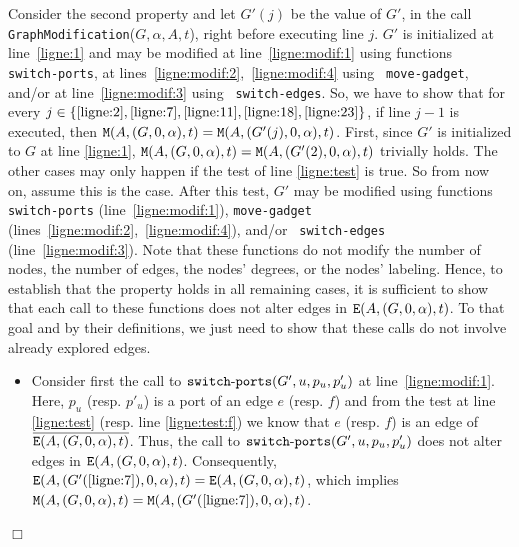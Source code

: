 \documentclass[11pt]{article}
\newcommand{\qed}{\hfill $\Box$ \bigbreak}
\newenvironment{proof}{\noindent {\bf Proof.}}{\qed}
\begin{document}
{\begin{proof}
  Consider the second property and let $G'(j)$ be the value of $G'$, in the call {\tt
    GraphModification}($G,\alpha,A,t$),
  right before executing line $j$.
$G'$ is initialized at line~\ref{ligne:1} and may be modified
  at line~\ref{ligne:modif:1} using functions {\tt
    switch\mbox{-}ports}, at
  lines~\ref{ligne:modif:2},~\ref{ligne:modif:4} using {\tt
    move\mbox{-}gadget}, and/or at line~\ref{ligne:modif:3} using {\tt
    switch\mbox{-}edges}. 
So, we have to show that for every $j \in\{\ref{ligne:2},
  \ref{ligne:7}, \ref{ligne:11}, \ref{ligne:18},\ref{ligne:23}\}$, if
  line $j-1$ is executed, then ${\tt M}(A,(G,0,\alpha),t)={\tt
    M}(A,(G'(j),0,\alpha),t)$.
First, since $G'$ is initialized to $G$ at line \ref{ligne:1}, ${\tt M}(A,(G,0,\alpha),t)={\tt
    M}(A,(G'(2),0,\alpha),t)$ trivially holds.
The other cases may only happen if the test of line \ref{ligne:test}
is true. So from now on, assume this is the case.  After this test,
$G'$ may be modified using functions {\tt switch\mbox{-}ports}
(line~\ref{ligne:modif:1}), {\tt move\mbox{-}gadget}
(lines~\ref{ligne:modif:2},~\ref{ligne:modif:4}), and/or {\tt
  switch\mbox{-}edges} (line~\ref{ligne:modif:3}). Note that these
functions do not modify the number of nodes, the number of edges, the
nodes' degrees, or the nodes' labeling. Hence, to establish that the
property holds in all remaining cases, it is sufficient to show that
each call to these functions does not alter edges in ${\tt
  E}(A,(G,0,\alpha),t)$. To that goal and by their definitions, we just
need to show that these calls do not involve already explored edges.
\begin{itemize}
  \item Consider first the call to ${\tt
    switch\mbox{-}ports}(G',u,p_u,p'_u)$ at
    line~\ref{ligne:modif:1}. Here, $p_u$ (resp. $p'_u$) is a port of
    an edge $e$ (resp. $f$) and from the test at line \ref{ligne:test}
    (resp. line \ref{ligne:test:f}) we know that $e$ (resp. $f$) is an
    edge of $\overline{{\tt E}(A,(G,0,\alpha),t)}$. Thus, the call to
    ${\tt switch\mbox{-}ports}(G',u,p_u,p'_u)$ does not alter edges in
    ${\tt E}(A,(G,0,\alpha),t)$. Consequently, ${\tt
      E}(A,(G'(\ref{ligne:7}),0,\alpha),t) = {\tt
      E}(A,(G,0,\alpha),t)$, which implies ${\tt
      M}(A,(G,0,\alpha),t)={\tt M}(A,(G'(\ref{ligne:7}),0,\alpha),t)$.


\end{itemize}
\end{proof}}
\end{document}
